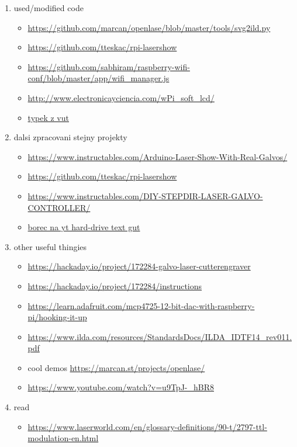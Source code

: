 \documentclass{template/socthesis}
\begin{document}
\begin{enumerate}
  \item used/modified code
        \begin{itemize}
          \item \url{https://github.com/marcan/openlase/blob/master/tools/svg2ild.py}
          \item \url{https://github.com/tteskac/rpi-lasershow}
          \item \url{https://github.com/sabhiram/raspberry-wifi-conf/blob/master/app/wifi\_manager.js}
          \item \url{http://www.electronicayciencia.com/wPi_soft_lcd/}
          \item \href{https://dspace.vutbr.cz/bitstream/handle/11012/38621/final-thesis.pdf?sequence=-1}{typek z vut}
        \end{itemize}
  \item dalsi zpracovani stejny projekty
        \begin{itemize}
          \item \url{https://www.instructables.com/Arduino-Laser-Show-With-Real-Galvos/}
          \item \url{https://github.com/tteskac/rpi-lasershow}
          \item \url{https://www.instructables.com/DIY-STEPDIR-LASER-GALVO-CONTROLLER/}
          \item \href{https://youtu.be/u9TpJ-_hBR8?si=mHy-UrptZZJ0Xu5-}{borec na yt hard-drive text gut}
        \end{itemize}
  \item other useful thingies
        \begin{itemize}
          \item \url{https://hackaday.io/project/172284-galvo-laser-cutterengraver}

          \item \url{https://hackaday.io/project/172284/instructions}

          \item \url{https://learn.adafruit.com/mcp4725-12-bit-dac-with-raspberry-pi/hooking-it-up}
          \item \url{https://www.ilda.com/resources/StandardsDocs/ILDA_IDTF14_rev011.pdf}
          \item cool demos \url{https://marcan.st/projects/openlase/}
          \item \url{https://www.youtube.com/watch?v=u9TpJ-_hBR8}
        \end{itemize}
  \item read
        \begin{itemize}
          \item \url{https://www.laserworld.com/en/glossary-definitions/90-t/2797-ttl-modulation-en.html}
        \end{itemize}

\end{enumerate}
\end{document}
